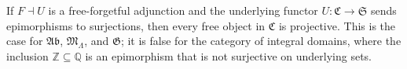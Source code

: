 If $F \dashv U$ is a free-forgetful adjunction and the underlying functor $U: \mathfrak{C} \to \mathfrak{S}$ sends epimorphisms to surjections, then every free object in $\mathfrak{C}$ is projective. This is the case for $\mathfrak{Ab}$, $\mathfrak{M}_{\Lambda}$, and $\mathfrak{G}$; it is false for the category of integral domains, where the inclusion $\mathbb{Z} \subseteq \mathbb{Q}$ is an epimorphism that is not surjective on underlying sets.
